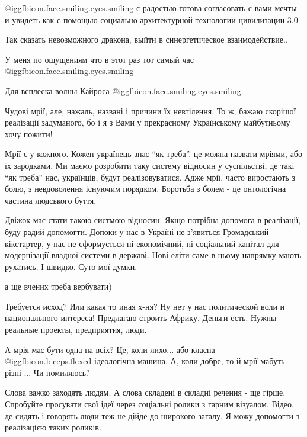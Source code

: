 \begin{itemize}
@igg{fbicon.face.smiling.eyes.smiling}  с радостью готова согласовать с вами
мечты и увидеть как с помощью социально архитектурной технологии цивилизации
3.0

Так сказать невозможного дракона, выйти в синергетическое взаимодействие..

У меня по ощущениям что в этот раз тот самый час  @igg{fbicon.face.smiling.eyes.smiling} 

Для всплеска волны Кайроса  @igg{fbicon.face.smiling.eyes.smiling} 


Чудові мрії, але, нажаль, названі і причини їх невтілення. То ж, бажаю скорішої
реалізації задуманого, бо і я з Вами у прекрасному Українському майбутньому
хочу пожити!


Мрії є у кожного. Кожен українець знає \enquote{як треба}. це можна назвати мріями, або
їх зародками. Ми маємо розробити таку систему відносин у суспільстві, де такі
\enquote{як треба} нас, українців, будут реалізовуватися. Адже мрії, часто виростають з
болю, з невдоволення існуючим порядком. Боротьба з болем - це онтологічна
частина людського буття.

\begin{itemize} %

Двіжок має стати такою систмою відносин. Якщо потрібна допомога в реалізації,
буду радий допомогти. Допоки у нас в Україні не з'явиться Громадський
кікстартер, у нас не сформується ні економічний, ні соціальний капітал для
модернізації владної системи в державі. Нові еліти саме в цьому напрямку мають
рухатись. І швидко. Суто мої думки.

а ще вчених треба вербувати)
\end{itemize} %


Требуется исход? Или какая то иная х-ня? Ну нет у нас политической воли и
национального интереса! Предлагаю строить Африку. Деньги есть. Нужны реальные
проекты, предприятия, люди.


А мрія має бути одна на всіх? Це, коли лихо... або класна @igg{fbicon.biceps.flexed} ідеологічна машина.
А, коли добре, то й мрії мабуть різні ... Чи помиляюсь?


Слова важко заходять людям. А слова складені в складні речення - ще гірше.
Спробуйте просувати свої ідеї через соціальні ролики з гарним візуалом. Відео,
де сидять і говорять люди теж не дійде до широкого загалу. Я можу допомогти з
реалізацією таких роликів.

\end{itemize} %

